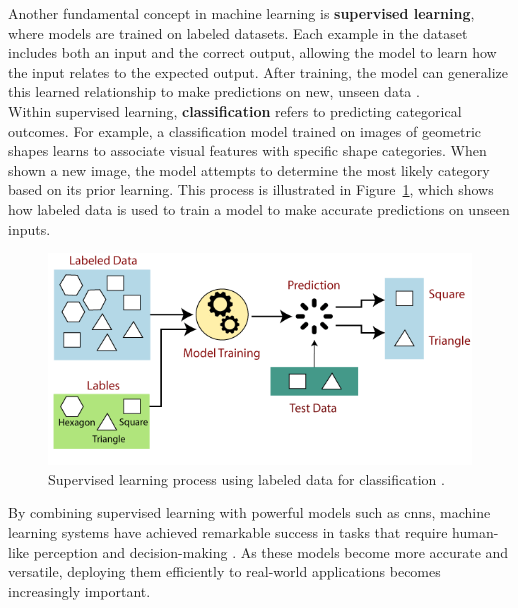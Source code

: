 Another fundamental concept in machine learning is \textbf{supervised learning}, where models are trained on labeled datasets. Each example in the dataset includes both an input and the correct output, allowing the model to learn how the input relates to the expected output. After training, the model can generalize this learned relationship to make predictions on new, unseen data \cite{geeksforgeeks:supervised-learning, google:supervised-learning}. \\

Within supervised learning, \textbf{classification} refers to predicting categorical outcomes. For example, a classification model trained on images of geometric shapes learns to associate visual features with specific shape categories. When shown a new image, the model attempts to determine the most likely category based on its prior learning. This process is illustrated in Figure~\ref{fig:supervised-learning}, which shows how labeled data is used to train a model to make accurate predictions on unseen inputs. \\

\newpage

\begin{figure}[h!] \centering \includegraphics[width=0.75\linewidth]{figures/theory/machine-learning/supervised-learning.png} \caption[Supervised learning with labeled data]{Supervised learning process using labeled data for classification \cite{tpointtech:supervised-learning}.} \label{fig:supervised-learning} \end{figure}



By combining supervised learning with powerful models such as \glspl{cnn}, machine learning systems have achieved remarkable success in tasks that require human-like perception and decision-making \cite{chengyi:cnn}. As these models become more accurate and versatile, deploying them efficiently to real-world applications becomes increasingly important.  \\

